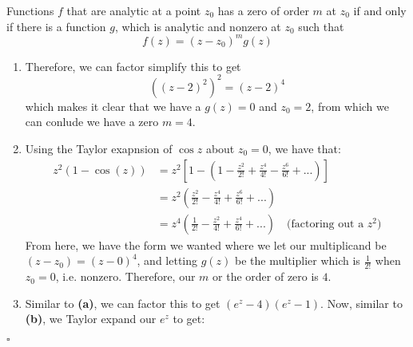 \documentclass[12pt]{article}
\newenvironment{proof}{\noindent{\bf Proof.}}{\hfill $\square$\medskip}
\begin{document}
\begin{proof}
    Functions $f$ that are analytic at a point $z_{0}$ has a zero of order $m$ at $z_{0}$ if and only if there is a function $g$, which is analytic and nonzero at $z_{0}$ such that
    $$f(z)=(z-z_{0})^{m}g(z)$$
    \begin{enumerate}[label=\textbf{(\alph*)}]
        \item Therefore, we can factor simplify this to get
        $$((z-2)^{2})^{2}=(z-2)^{4}$$
        which makes it clear that we have a $g(z)=0$ and $z_{0}=2$, from which we can conlude we have a zero $m=4$.
        \item Using the Taylor exapnsion of $\cos z$ about $z_{0}=0$, we have that:
        \begin{equation}
        \begin{split}
        z^{2}(1-\cos(z))&=z^{2}\left[1-\left(1-\frac{z^{2}}{2!}+\frac{z^{4}}{4!}-\frac{z^{6}}{6!}+...\right)\right]\\
        &=z^{2}\left(\frac{z^{2}}{2!}-\frac{z^{4}}{4!}+\frac{z^{6}}{6!}+...\right)\\
        &=z^{4}\left(\frac{1}{2!}-\frac{z^{2}}{4!}+\frac{z^{4}}{6!}+...\right)\quad\text{(factoring out a }z^{2}\text{)}
        \end{split}
        \end{equation}
        From here, we have the form we wanted where we let our multiplicand be $(z-z_{0})=(z-0)^{4}$, and letting $g(z)$ be the multiplier which is $\frac{1}{2!}$ when $z_{0}=0$, i.e. nonzero. Therefore, our $m$ or the order of zero is $4$.
        \item Similar to \textbf{(a)}, we can factor this to get $(e^{z}-4)(e^{z}-1)$. Now, similar to \textbf{(b)}, we Taylor expand our $e^{z}$ to get:
    \end{enumerate}
\end{proof}


\newpage
\end{document}
